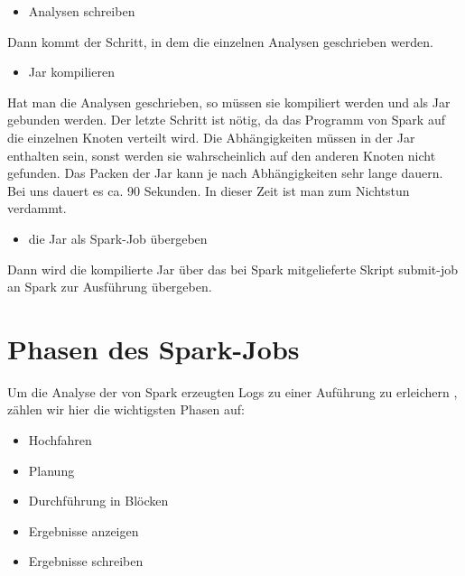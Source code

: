 \begin{itemize}
\item Analysen schreiben
\end{itemize}
Dann kommt der Schritt, in dem die einzelnen Analysen geschrieben
werden.

\begin{itemize}
\item Jar kompilieren
\end{itemize}
Hat man die Analysen geschrieben, so müssen sie kompiliert werden und
als Jar gebunden werden. Der letzte Schritt ist nötig, da das Programm
von Spark auf die einzelnen Knoten verteilt wird. Die Abhängigkeiten
müssen in der Jar enthalten sein, sonst werden sie wahrscheinlich auf
den anderen Knoten nicht gefunden. Das Packen der Jar kann je nach
Abhängigkeiten sehr lange dauern. Bei uns dauert es ca. 90 Sekunden. In
dieser Zeit ist man zum Nichtstun verdammt.

\begin{itemize}
\item die Jar als Spark-Job übergeben
\end{itemize}
Dann wird die kompilierte Jar über das bei Spark mitgelieferte Skript
submit-job an Spark zur Ausführung übergeben.

\section{Phasen des
Spark-Jobs}
Um die Analyse der von Spark erzeugten Logs zu einer Auführung zu
erleichern , zählen wir hier die wichtigsten Phasen auf:

\begin{itemize}
\item Hochfahren
\item Planung
\item Durchführung in Blöcken
\item Ergebnisse anzeigen
\item Ergebnisse schreiben
\end{itemize}

